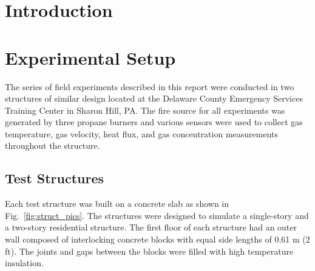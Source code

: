 \documentclass[12pt,oneside]{book}
\begin{document}
\mainmatter

\chapter{Introduction}
\label{chap:Introduction}

\chapter{Experimental Setup}
\label{chap:Experimental_Setup}
The series of field experiments described in this report were conducted in two structures of similar design located at the Delaware County Emergency Services Training Center in Sharon Hill, PA. The fire source for all experiments was generated by three propane burners and various sensors were used to collect gas temperature, gas velocity, heat flux, and gas concentration measurements throughout the structure.

\section{Test Structures}
\label{sec:Test_Structures}
Each test structure was built on a concrete slab as shown in Fig.~\ref{fig:struct_pics}. The structures were designed to simulate a single-story and a two-story residential structure. The first floor of each structure had an outer wall composed of interlocking concrete blocks with equal side lengths of 0.61 m (2 ft). The joints and gaps between the blocks were filled with high temperature insulation.
\end{document}
